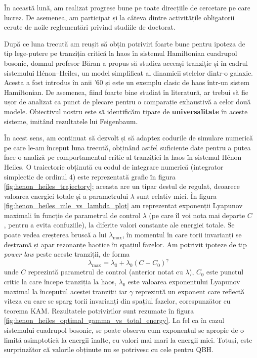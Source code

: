 
\makereportpreamble

În această lună, am realizat progrese bune pe toate direcțiile de cercetare pe care lucrez. De asemenea, am participat și la câteva dintre activitățile obligatorii cerute de noile reglementări privind studiile de doctorat.

După ce luna trecută am reușit să obțin potriviri foarte bune pentru ipoteza de tip lege-putere pe tranziția critică la haos în sistemul Hamiltonian cuadrupol bosonic, domnul profesor Băran a propus să studiez aceeași tranziție și în cadrul sistemului Hénon–Heiles, un model simplificat al dinamicii stelelor dintr-o galaxie. Acesta a fost introdus în anii '60 și este un exemplu clasic de haos într-un sistem Hamiltonian. De asemenea, fiind foarte bine studiat în literatură, ar trebui să fie ușor de analizat ca punct de plecare pentru o comparație exhaustivă a celor două modele. Obiectivul nostru este să identificăm tipare de \textbf{universalitate} în aceste sisteme, imitând rezultatele lui Feigenbaum.

În acest sens, am continuat să dezvolt și să adaptez codurile de simulare numerică pe care le-am început luna trecută, obținând astfel suficiente date pentru a putea face o analiză pe comportamentul critic al tranziției la haos în sistemul Hénon–Heiles. O traiectorie obținută cu codul de integrare numerică (integrator simplectic de ordinul 4) este reprezentată grafic în figura \ref{fig:henon_heiles_trajectory}; aceasta are un tipar destul de regulat, deoarece valoarea energiei totale și a parametrului \(\lambda\) sunt relativ mici. În figura \ref{fig:henon_heiles_mle_vs_lambda_plot} am reprezentat exponenții Lyapunov maximali în funcție de parametrul de control \(\lambda\) (pe care îl voi nota mai departe \(C\), pentru a evita confuziile), la diferite valori constante ale energiei totale. Se poate vedea creșterea bruscă a lui \(\lambda_{\text{max}}\), în momentul în care torii invarianți se destramă și apar rezonanțe haotice în spațiul fazelor. Am potrivit ipoteze de tip \textit{power law} peste aceste tranziții, de forma
\[
    \lambda_{\text{max}} = \lambda_0 + \lambda_0 \left(C - C_0\right)^{\gamma}
\]
unde \(C\) reprezintă parametrul de control (anterior notat cu \(\lambda\)), \(C_0\) este punctul critic la care începe tranziția la haos, \(\lambda_0\) este valoarea exponentului Lyapunov maximal la începutul acestei tranziții iar \(\gamma\) reprezintă un exponent care reflectă viteza cu care se sparg torii invarianți din spațiul fazelor, corespunzător cu teorema KAM. Rezultatele potrivirilor sunt rezumate în figura \ref{fig:henon_heiles_optimal_gamma_vs_total_energy}. La fel ca în cazul sistemului cuadrupol bosonic, se poate observa cum exponentul se apropie de o limită asimptotică la energii înalte, cu valori mai mari la energii mici. Totuși, este surprinzător că valorile obținute nu se potrivesc cu cele pentru QBH.

